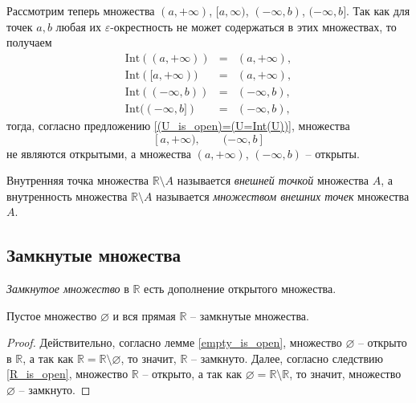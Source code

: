 \begin{example}\label{(a,8)c(open)}
    Рассмотрим теперь множества $(a, +\infty)$, $[a,\infty)$, $(-\infty, b)$,  $(-\infty,b]$. Так как для точек $a,b$ любая их $\varepsilon$-окрестность не может содержаться в этих множествах, то получаем
    \begin{eqnarray*}
        \mathrm{Int}((a, +\infty)) &=& (a, +\infty), \\
        \mathrm{Int}([a, +\infty)) &=& (a, +\infty), \\
        \mathrm{Int}((-\infty, b)) &=& (-\infty, b), \\
        \mathrm{Int}((-\infty, b]) &=& (-\infty, b),
    \end{eqnarray*}
тогда, согласно предложению \ref{(U_is_open)=(U=Int(U))}, множества
\[
 [a, +\infty), \qquad (-\infty, b]
\]
не являются открытыми, а множества  $(a, +\infty)$, $(-\infty, b)$ -- открыты.
\end{example}


\begin{definition}
    Внутренняя точка множества $\mathbb{R}\setminus A$ называется \textit{внешней точкой} множества $A$, а внутренность множества $\mathbb{R}\setminus A$ называется \textit{множеством внешних точек} множества $A$.
\end{definition}



\subsection{Замкнутые множества}

\begin{definition}\label{def_of_closed}
    \textit{Замкнутое множество} в $\mathbb{R}$ есть дополнение открытого множества. 
\end{definition}

\begin{lemma}
Пустое множество $\varnothing$ и вся прямая $\mathbb{R}$ -- замкнутые множества.
\end{lemma}

\begin{proof}
    Действительно, согласно лемме \ref{empty_is_open}, множество $\varnothing$ -- открыто в $\mathbb{R}$, а так как $\mathbb{R} = \mathbb{R}\setminus \varnothing$, то значит, $\mathbb{R}$ -- замкнуто. Далее, согласно следствию \ref{R_is_open}, множество $\mathbb{R}$ -- открыто, а так как $\varnothing = \mathbb{R} \setminus \mathbb{R}$, то значит, множество $\varnothing$ -- замкнуто.
\end{proof}


